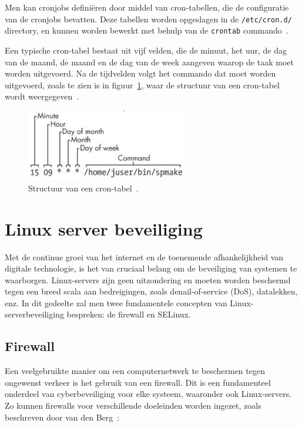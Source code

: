 Men kan cronjobs defini\"eren door middel van cron-tabellen, die de configuratie van de cronjobs bevatten.
Deze tabellen worden opgeslagen in de \texttt{/etc/cron.d/} directory, en kunnen worden bewerkt met behulp van de \texttt{crontab} commando~\autocite{ward2021linux}.

Een typische cron-tabel bestaat uit vijf velden, die de minuut, het uur, de dag van de maand, de maand en de dag van de week aangeven waarop de taak moet worden uitgevoerd.
Na de tijdvelden volgt het commando dat moet worden uitgevoerd, zoals te zien is in figuur~\ref{fig:cronjob-structure}, waar de structuur van een cron-tabel wordt weergegeven~\autocite{ward2021linux}.

\begin{figure}[h!]
    \begin{center}
        \includegraphics[width=200pt]
        {./graphics/linux/cronjob-structure.png}
        \caption[Structuur van een cron-tabel.]{\label{fig:cronjob-structure}Structuur van een cron-tabel~\autocite{ward2021linux}.}
    \end{center}
\end{figure}

\section{Linux server beveiliging}
\label{linux_server_beveiliging}

Met de continue groei van het internet en de toenemende afhankelijkheid van digitale technologie, is het van cruciaal belang om de beveiliging van systemen te waarborgen.
Linux-servers zijn geen uitzondering en moeten worden beschermd tegen een breed scala aan bedreigingen, zoals denail-of-service (DoS), datalekken, enz.
In dit gedeelte zal men twee fundamentele concepten van Linux-serverbeveiliging bespreken: de firewall en SELinux.

\subsection{Firewall}
\label{linux_firewall}

Een veelgebruikte manier om een computernetwerk te beschermen tegen ongewenst verkeer is het gebruik van een firewall.
Dit is een fundamenteel onderdeel van cyberbeveiliging voor elke systeem, waaronder ook Linux-servers.
Zo kunnen firewalls voor verschillende doeleinden worden ingezet, zoals beschreven door van den Berg~\autocite{vandenberg}:

